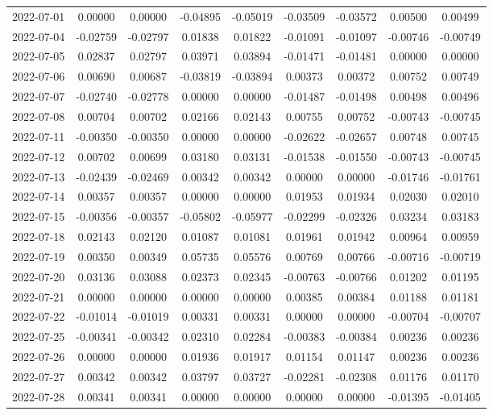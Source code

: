 {\begin{footnotesize}
\begin{longtable}{lcccccccc}
2022-07-01 & 0.00000 & 0.00000 & -0.04895 & -0.05019 & -0.03509 & -0.03572 & 0.00500 & 0.00499 \\
2022-07-04 & -0.02759 & -0.02797 & 0.01838 & 0.01822 & -0.01091 & -0.01097 & -0.00746 & -0.00749 \\
2022-07-05 & 0.02837 & 0.02797 & 0.03971 & 0.03894 & -0.01471 & -0.01481 & 0.00000 & 0.00000 \\
2022-07-06 & 0.00690 & 0.00687 & -0.03819 & -0.03894 & 0.00373 & 0.00372 & 0.00752 & 0.00749 \\
2022-07-07 & -0.02740 & -0.02778 & 0.00000 & 0.00000 & -0.01487 & -0.01498 & 0.00498 & 0.00496 \\
2022-07-08 & 0.00704 & 0.00702 & 0.02166 & 0.02143 & 0.00755 & 0.00752 & -0.00743 & -0.00745 \\
2022-07-11 & -0.00350 & -0.00350 & 0.00000 & 0.00000 & -0.02622 & -0.02657 & 0.00748 & 0.00745 \\
2022-07-12 & 0.00702 & 0.00699 & 0.03180 & 0.03131 & -0.01538 & -0.01550 & -0.00743 & -0.00745 \\
2022-07-13 & -0.02439 & -0.02469 & 0.00342 & 0.00342 & 0.00000 & 0.00000 & -0.01746 & -0.01761 \\
2022-07-14 & 0.00357 & 0.00357 & 0.00000 & 0.00000 & 0.01953 & 0.01934 & 0.02030 & 0.02010 \\
2022-07-15 & -0.00356 & -0.00357 & -0.05802 & -0.05977 & -0.02299 & -0.02326 & 0.03234 & 0.03183 \\
2022-07-18 & 0.02143 & 0.02120 & 0.01087 & 0.01081 & 0.01961 & 0.01942 & 0.00964 & 0.00959 \\
2022-07-19 & 0.00350 & 0.00349 & 0.05735 & 0.05576 & 0.00769 & 0.00766 & -0.00716 & -0.00719 \\
2022-07-20 & 0.03136 & 0.03088 & 0.02373 & 0.02345 & -0.00763 & -0.00766 & 0.01202 & 0.01195 \\
2022-07-21 & 0.00000 & 0.00000 & 0.00000 & 0.00000 & 0.00385 & 0.00384 & 0.01188 & 0.01181 \\
2022-07-22 & -0.01014 & -0.01019 & 0.00331 & 0.00331 & 0.00000 & 0.00000 & -0.00704 & -0.00707 \\
2022-07-25 & -0.00341 & -0.00342 & 0.02310 & 0.02284 & -0.00383 & -0.00384 & 0.00236 & 0.00236 \\
2022-07-26 & 0.00000 & 0.00000 & 0.01936 & 0.01917 & 0.01154 & 0.01147 & 0.00236 & 0.00236 \\
2022-07-27 & 0.00342 & 0.00342 & 0.03797 & 0.03727 & -0.02281 & -0.02308 & 0.01176 & 0.01170 \\
2022-07-28 & 0.00341 & 0.00341 & 0.00000 & 0.00000 & 0.00000 & 0.00000 & -0.01395 & -0.01405 \\

\end{longtable}
\end{footnotesize}}
